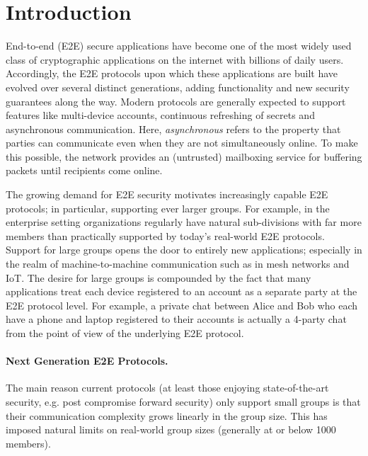 

\section{Introduction}
End-to-end (E2E) secure applications have become one of the most widely used
class of cryptographic applications on the internet with billions of daily
users. Accordingly, the E2E protocols upon which these applications are built
have evolved over several distinct generations, adding functionality and new
security guarantees along the way. Modern protocols are generally expected to
support features like multi-device accounts, continuous refreshing of secrets
and asynchronous communication. Here, \emph{asynchronous} refers to the
property that parties can communicate even when they are not simultaneously
online. To make this possible, the network provides an (untrusted) mailboxing
service for buffering packets until recipients come online.

The growing demand for E2E security motivates increasingly capable E2E
protocols; in particular, supporting ever larger groups. For example, in the
enterprise setting organizations regularly have natural sub-divisions with
far more members than practically supported by today's real-world E2E
protocols. Support for large groups opens the door to entirely new
applications; especially in the realm of machine-to-machine communication
such as in mesh networks and IoT. The desire for large groups is compounded
by the fact that many applications treat each device registered to an account
as a separate party at the E2E protocol level. For example, a private chat
between Alice and Bob who each have a phone and laptop registered to their
accounts is actually a 4-party chat from the point of view of the underlying
E2E protocol.

\paragraph{Next Generation E2E Protocols.}
The main reason current protocols (at least those enjoying state-of-the-art
security, {e.g. post compromise forward security}) only support small groups
is that their communication complexity grows linearly in the group size. This
has imposed natural limits on real-world group sizes (generally at or below
1000 members).

